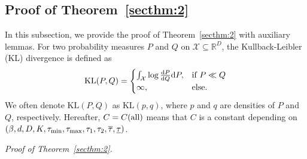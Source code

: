 \documentclass[twoside,11pt]{article}
\def\cX{\mathcal X}
\newcommand{\bbR}{{\mathbb R}}
\newcommand{\bean}{\setlength\arraycolsep{1pt}\begin{eqnarray*}}
\newcommand{\eean}{\end{eqnarray*}}
\def\d{{\rm d}}
\begin{document}
\subsection{ Proof of Theorem~\ref{secthm:2} }

In this subsection, we provide the proof of Theorem~\ref{secthm:2} with auxiliary lemmas.
For two probability measures $P$ and $Q$ on $\cX \subseteq \bbR^{D}$, the Kullback-Leibler (KL) divergence is defined as
\bean
\text{KL}(P,Q) = 
\begin{cases}
\int_{\cX} \log \frac{\d P}{\d Q} \d P, & \text{if } P \ll Q
\\
\infty, & \text{else}.
\end{cases}
\eean
We often denote $\text{KL}(P,Q)$ as $\text{KL}(p,q)$, where $p$ and $q$ are densities of $P$ and $Q$, respectively.
Hereafter, $C = C({\rm all})$ means that $C$ is a constant depending on $(\beta,d,D,K,\tau_{\rm min},\tau_{\rm max},\tau_{1},\tau_{2},\overline{\tau},\underline{\tau})$.

\medskip

\textit{Proof of Theorem~\ref{secthm:2}.}
\end{document}
